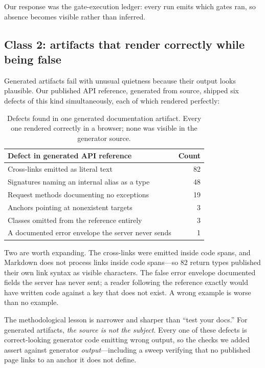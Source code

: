 \documentclass{article}
\begin{document}
Our response was the gate-execution ledger: every run emits which gates ran, so
absence becomes visible rather than inferred.

\subsection{Class 2: artifacts that render correctly while being false}

Generated artifacts fail with unusual quietness because their output looks
plausible. Our published API reference, generated from source, shipped six defects
of this kind simultaneously, each of which rendered perfectly:

\begin{table}[t]
\centering
\small
\begin{tabular}{@{}lr@{}}
\toprule
\textbf{Defect in generated API reference} & \textbf{Count} \\
\midrule
Cross-links emitted as literal text & 82 \\
Signatures naming an internal alias as a type & 48 \\
Request methods documenting no exceptions & 19 \\
Anchors pointing at nonexistent targets & 3 \\
Classes omitted from the reference entirely & 3 \\
A documented error envelope the server never sends & 1 \\
\bottomrule
\end{tabular}
\caption{Defects found in one generated documentation artifact. Every one rendered
correctly in a browser; none was visible in the generator source.}
\label{tab:docdefects}
\end{table}

Two are worth expanding. The cross-links were emitted inside code spans, and
Markdown does not process links inside code spans---so 82 return types published
their own link syntax as visible characters. The false error envelope documented
fields the server has never sent; a reader following the reference exactly would
have written code against a key that does not exist. A wrong example is worse than
no example.

The methodological lesson is narrower and sharper than ``test your docs.'' For
generated artifacts, \emph{the source is not the subject}. Every one of these
defects is correct-looking generator code emitting wrong output, so the checks we
added assert against generator \emph{output}---including a sweep verifying that no
published page links to an anchor it does not define.
\end{document}
